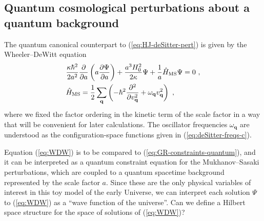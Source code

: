 \documentclass[12pt]{iopart}
\def\eq#1{\begin{equation}\begin{aligned}#1\end{aligned}\end{equation}}
\def\eref#1{(\ref{eq:#1})}
\def\del#1#2{\frac{\partial#1}{\partial#2}}
\def\q{\mathbf{q}}
\begin{document}
\subsection{Quantum cosmological perturbations about a quantum background}
The quantum canonical counterpart to \eref{HJ-deSitter-pert} is given by the Wheeler--DeWitt equation
\eq{\label{eq:WDW}
&\frac{\kappa\hbar^2}{2a^2}\del{}{a}\left(a\del{\Psi}{a}\right)+\frac{a^3H_0^2}{2\kappa}\Psi+\frac{1}{a}\hat{H}_{\rm MS}\Psi = 0 \ , \\
&\hat{H}_{\rm MS} = \frac{1}{2}\sum_{\q}\left(-\hbar^2\del{^2}{v_{\q}^2}+\omega_{\q}v_{\q}^2\right) \ ,
}
where we fixed the factor ordering in the kinetic term of the scale factor in a way that will be convenient for later calculations. The oscillator frequencies $\omega_{\q}$ are understood as the configuration-space functions given in \eref{deSitter-freqs-c}.

Equation \eref{WDW} is to be compared to \eref{GR-constraints-quantum}, and it can be interpreted as a quantum constraint equation for the Mukhanov--Sasaki perturbations, which are coupled to a quantum spacetime background represented by the scale factor $a$. Since these are the only physical variables of interest in this toy model of the early Universe, we can interpret each solution $\Psi$ to \eref{WDW} as a ``wave function of the universe''. Can we define a Hilbert space structure for the space of solutions of \eref{WDW}?
\end{document}

